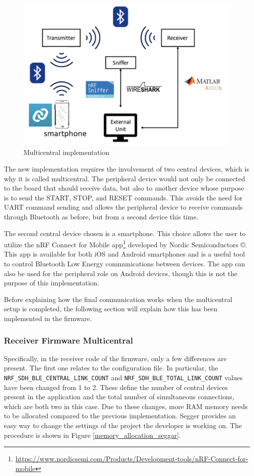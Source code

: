 \documentclass{Configuration_Files/PoliMi3i_thesis}
\begin{document}
\begin{figure}[H]
    \centering
    \includegraphics[scale=0.5]{Multicentral/2.png}
    \caption{Multicentral implementation}
    \label{multicentral_2}
\end{figure}

The new implementation requires the involvement of two central devices, which is why it is called multicentral. The peripheral device would not only be connected to the board that should receive data, but also to another device whose purpose is to send the START, STOP, and RESET commands. This avoids the need for UART command sending and allows the peripheral device to receive commands through Bluetooth as before, but from a second device this time.

The second central device chosen is a smartphone. This choice allows the user to utilize the nRF Connect for Mobile app\footnote{\url{https://www.nordicsemi.com/Products/Development-tools/nRF-Connect-for-mobile}} developed by Nordic Semiconductors ©. This app is available for both iOS and Android smartphones and is a useful tool to control Bluetooth Low Energy communications between devices. The app can also be used for the peripheral role on Android devices, though this is not the purpose of this implementation.

Before explaining how the final communication works when the multicentral setup is completed, the following section will explain how this has been implemented in the firmware.

\subsubsection{Receiver Firmware Multicentral}
Specifically, in the receiver code of the firmware, only a few differences are present. The first one relates to the configuration file. In particular, the \texttt{NRF\_SDH\_BLE\_CENTRAL\_LINK\_COUNT} and \texttt{NRF\_SDH\_BLE\_TOTAL\_LINK\_COUNT} values have been changed from 1 to 2. These define the number of central devices present in the application and the total number of simultaneous connections, which are both two in this case. Due to these changes, more RAM memory needs to be allocated compared to the previous implementation. Segger provides an easy way to change the settings of the project the developer is working on. The procedure is shown in Figure \ref{memory_allocation_seggar}.
\end{document}
